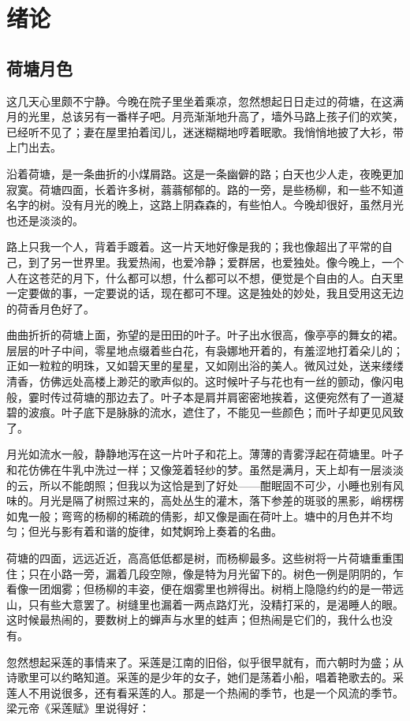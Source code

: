 \chapter{绪论}
\section{荷塘月色}
这几天心里颇不宁静。今晚在院子里坐着乘凉，忽然想起日日走过的荷塘，在这满月的光里，总该另有一番样子吧。月亮渐渐地升高了，墙外马路上孩子们的欢笑，已经听不见了；妻在屋里拍着闰儿，迷迷糊糊地哼着眠歌。我悄悄地披了大衫，带上门出去。

沿着荷塘，是一条曲折的小煤屑路。这是一条幽僻的路；白天也少人走，夜晚更加寂寞。荷塘四面，长着许多树，蓊蓊郁郁的。路的一旁，是些杨柳，和一些不知道名字的树。没有月光的晚上，这路上阴森森的，有些怕人。今晚却很好，虽然月光也还是淡淡的。

路上只我一个人，背着手踱着。这一片天地好像是我的；我也像超出了平常的自己，到了另一世界里。我爱热闹，也爱冷静；爱群居，也爱独处。像今晚上，一个人在这苍茫的月下，什么都可以想，什么都可以不想，便觉是个自由的人。白天里一定要做的事，一定要说的话，现在都可不理。这是独处的妙处，我且受用这无边的荷香月色好了。

曲曲折折的荷塘上面，弥望的是田田的叶子。叶子出水很高，像亭亭的舞女的裙。层层的叶子中间，零星地点缀着些白花，有袅娜地开着的，有羞涩地打着朵儿的；正如一粒粒的明珠，又如碧天里的星星，又如刚出浴的美人。微风过处，送来缕缕清香，仿佛远处高楼上渺茫的歌声似的。这时候叶子与花也有一丝的颤动，像闪电般，霎时传过荷塘的那边去了。叶子本是肩并肩密密地挨着，这便宛然有了一道凝碧的波痕。叶子底下是脉脉的流水，遮住了，不能见一些颜色；而叶子却更见风致了。

月光如流水一般，静静地泻在这一片叶子和花上。薄薄的青雾浮起在荷塘里。叶子和花仿佛在牛乳中洗过一样；又像笼着轻纱的梦。虽然是满月，天上却有一层淡淡的云，所以不能朗照；但我以为这恰是到了好处——酣眠固不可少，小睡也别有风味的。月光是隔了树照过来的，高处丛生的灌木，落下参差的斑驳的黑影，峭楞楞如鬼一般；弯弯的杨柳的稀疏的倩影，却又像是画在荷叶上。塘中的月色并不均匀；但光与影有着和谐的旋律，如梵婀玲上奏着的名曲。

荷塘的四面，远远近近，高高低低都是树，而杨柳最多。这些树将一片荷塘重重围住；只在小路一旁，漏着几段空隙，像是特为月光留下的。树色一例是阴阴的，乍看像一团烟雾；但杨柳的丰姿，便在烟雾里也辨得出。树梢上隐隐约约的是一带远山，只有些大意罢了。树缝里也漏着一两点路灯光，没精打采的，是渴睡人的眼。这时候最热闹的，要数树上的蝉声与水里的蛙声；但热闹是它们的，我什么也没有。

忽然想起采莲的事情来了。采莲是江南的旧俗，似乎很早就有，而六朝时为盛；从诗歌里可以约略知道。采莲的是少年的女子，她们是荡着小船，唱着艳歌去的。采莲人不用说很多，还有看采莲的人。那是一个热闹的季节，也是一个风流的季节。梁元帝《采莲赋》里说得好：


